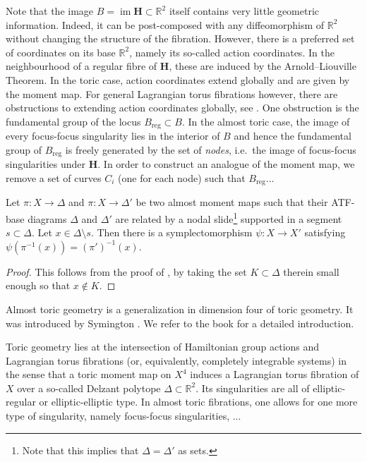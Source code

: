 \documentclass[12pt,a4paper,draft]{scrartcl}
\DeclareMathOperator{\im}{im}
\begin{document}
Note that the image $B = \im \mathbf{H} \subset \mathbb{R}^2$ itself contains very little geometric information. Indeed, it can be post-composed with any diffeomorphism of $\mathbb{R}^2$ without changing the structure of the fibration. However, there is a preferred set of coordinates on its base $\mathbb{R}^2$, namely its so-called action coordinates. In the neighbourhood of a regular fibre of $\mathbf{H}$, these are induced by the Arnold--Liouville Theorem. In the toric case, action coordinates extend globally and are given by the moment map. For general Lagrangian torus fibrations however, there are obstructions to extending action coordinates globally, see \cite{Dui80}. One obstruction is the fundamental group of the locus $B_{\text{reg}} \subset B$. In the almost toric case, the image of every focus-focus singularity lies in the interior of $B$ and hence the fundamental group of $B_{\text{reg}}$ is freely generated by the set of \emph{nodes}, i.e.\ the image of focus-focus singularities under $\symbf{H}$. In order to construct an analogue of the moment map, we remove a set of curves $C_i$ (one for each node) such that $B_{\text{reg}}$...




\begin{lemma}
    \label{lem:atfsclass}
    Let $\pi \colon X \rightarrow \Delta$ and $\pi \colon X \rightarrow \Delta'$ be two almost moment maps such that their ATF-base diagrams $\Delta$ and $\Delta'$ are related by a nodal slide\footnote{Note that this implies that $\Delta = \Delta'$ as sets.} supported in a segment $s \subset \Delta$. Let $x \in \Delta \setminus s$. Then there is a symplectomorphism $\psi \colon X \rightarrow X'$ satisfying $\psi(\pi^{-1}(x)) = (\pi')^{-1}(x)$.
\end{lemma}

\begin{proof}
    This follows from the proof of \cite[Theorem 8.10]{evans2021atfs}, by taking the set $K \subset \Delta$ therein small enough so that $x \notin K$.
\end{proof}





Almost toric geometry is a generalization in dimension four of toric geometry. It was introduced by Symington \cite{symington2002FourDF}. We refer to the book \cite{evans2021atfs} for a detailed introduction. 

Toric geometry lies at the intersection of Hamiltonian group actions and Lagrangian torus fibrations (or, equivalently, completely integrable systems) in the sense that a toric moment map on $X^4$ induces a Lagrangian torus fibration of $X$ over a so-called Delzant polytope $\Delta \subset \mathbb{R}^2$. Its singularities are all of elliptic-regular or elliptic-elliptic type. In almost toric fibrations, one allows for one more type of singularity, namely focus-focus singularities, ...
\end{document}

